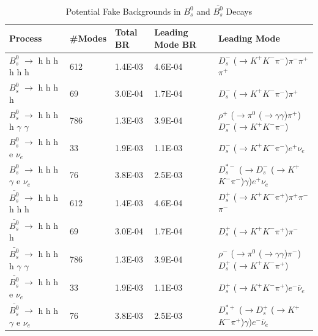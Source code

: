 \begin{table}[!ht]           
    \small
    \begin{tabular}{|| l | l | l | l | l ||}
        \hline
        {\textbf {Process}} & {\textbf {\#Modes}} & {\textbf {Total BR}} & {\textbf {Leading Mode BR}} & {\textbf {Leading Mode}}\\
        \hline
             ${B_s^0}$ $\to$ h h h h h h & 612 & 1.4E-03 & 4.6E-04 & $D_s^-$ ($\rightarrow$$K^+$$K^-$$\pi^-$)$\pi^-$$\pi^+$$\pi^+$  \\
             ${B_s^0}$ $\to$ h h h h & 69 & 3.0E-04 & 1.7E-04 & $D_s^-$ ($\rightarrow$$K^+$$K^-$$\pi^-$)$\pi^+$  \\
             ${B_s^0}$ $\to$ h h h h $\gamma$ $\gamma$ & 786 & 1.3E-03 & 3.9E-04 & $\rho^+$ ($\rightarrow$$\pi^0$ ($\rightarrow$$\gamma$$\gamma$)$\pi^+$)$D_s^-$ ($\rightarrow$$K^+$$K^-$$\pi^-$) \\
             ${B_s^0}$ $\to$ h h h e $\nu_e$ & 33 & 1.9E-03 & 1.1E-03 & $D_s^-$ ($\rightarrow$$K^+$$K^-$$\pi^-$)$e^+$$\nu_e$  \\
             ${B_s^0}$ $\to$ h h h $\gamma$ e $\nu_e$ & 76 & 3.8E-03 & 2.5E-03 & $D_s^{*-}$ ($\rightarrow$$D_s^-$ ($\rightarrow$$K^+$$K^-$$\pi^-$)$\gamma$)$e^+$$\nu_e$  \\
             $\bar{B_s^0}$ $\to$ h h h h h h & 612 & 1.4E-03 & 4.6E-04 & $D_s^+$ ($\rightarrow$$K^+$$K^-$$\pi^+$)$\pi^+$$\pi^-$$\pi^-$  \\
             $\bar{B_s^0}$ $\to$ h h h h & 69 & 3.0E-04 & 1.7E-04 & $D_s^+$ ($\rightarrow$$K^+$$K^-$$\pi^+$)$\pi^-$  \\
             $\bar{B_s^0}$ $\to$ h h h h  $\gamma$ $\gamma$ & 786 & 1.3E-03 & 3.9E-04 & $\rho^-$ ($\rightarrow$$\pi^0$ ($\rightarrow$$\gamma$$\gamma$)$\pi^-$)$D_s^+$ ($\rightarrow$$K^+$$K^-$$\pi^+$) \\
             $\bar{B_s^0}$ $\to$ h h h e $\nu_e$ & 33 & 1.9E-03 & 1.1E-03 & $D_s^+$ ($\rightarrow$$K^+$$K^-$$\pi^+$)$e^-$$\overline{\nu}_e$  \\
             $\bar{B_s^0}$ $\to$ h h h $\gamma$ e $\nu_e$ & 76 & 3.8E-03 & 2.5E-03 & $D_s^{*+}$ ($\rightarrow$$D_s^+$ ($\rightarrow$$K^+$$K^-$$\pi^+$)$\gamma$)$e^-$$\overline{\nu}_e$               \\
        \hline
        \hline
    \end{tabular}
    \caption{Potential Fake Backgrounds in $B_s^0$ and $\bar{B_s^0}$ Decays}
    \label{tab:potential-fake-backgrounds-bs}
\end{table}
